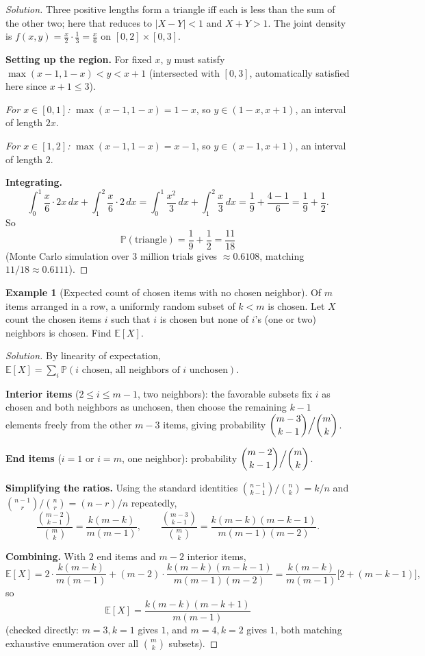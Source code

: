 \documentclass[11pt]{article}
\theoremstyle{definition}
\newtheorem{example}{Example}[section]
\newcommand{\E}{\mathbb{E}}
\begin{document}
\begin{proof}[Solution]
Three positive lengths form a triangle iff each is less than the sum of the other two; here that reduces to $|X-Y|<1$ and $X+Y>1$. The joint density is $f(x,y)=\tfrac x2\cdot\tfrac13=\tfrac x6$ on $[0,2]\times[0,3]$.

\textbf{Setting up the region.} For fixed $x$, $y$ must satisfy $\max(x-1,1-x)<y<x+1$ (intersected with $[0,3]$, automatically satisfied here since $x+1\le3$).

\emph{For $x\in[0,1]$:} $\max(x-1,1-x)=1-x$, so $y\in(1-x,x+1)$, an interval of length $2x$.

\emph{For $x\in[1,2]$:} $\max(x-1,1-x)=x-1$, so $y\in(x-1,x+1)$, an interval of length $2$.

\textbf{Integrating.}
\[
\int_0^1\frac x6\cdot2x\,dx+\int_1^2\frac x6\cdot2\,dx=\int_0^1\frac{x^2}3\,dx+\int_1^2\frac x3\,dx=\frac19+\frac{4-1}6=\frac19+\frac12.
\]
So
\[
\mathbb P(\text{triangle})=\frac19+\frac12=\boxed{\frac{11}{18}}
\]
(Monte Carlo simulation over $3$ million trials gives $\approx0.6108$, matching $11/18\approx0.6111$).
\end{proof}

\begin{example}[Expected count of chosen items with no chosen neighbor]
Of $m$ items arranged in a row, a uniformly random subset of $k<m$ is chosen. Let $X$ count the chosen items $i$ such that $i$ is chosen but none of $i$'s (one or two) neighbors is chosen. Find $\E[X]$.
\end{example}

\begin{proof}[Solution]
By linearity of expectation, $\E[X]=\sum_i \mathbb P(i \text{ chosen, all neighbors of } i \text{ unchosen})$.

\textbf{Interior items} ($2\le i\le m-1$, two neighbors): the favorable subsets fix $i$ as chosen and both neighbors as unchosen, then choose the remaining $k-1$ elements freely from the other $m-3$ items, giving probability $\dbinom{m-3}{k-1}\Big/\dbinom mk$.

\textbf{End items} ($i=1$ or $i=m$, one neighbor): probability $\dbinom{m-2}{k-1}\Big/\dbinom mk$.

\textbf{Simplifying the ratios.} Using the standard identities $\binom{n-1}{k-1}/\binom nk=k/n$ and $\binom{n-1}{r}/\binom nr=(n-r)/n$ repeatedly,
\[
\frac{\binom{m-2}{k-1}}{\binom mk}=\frac{k(m-k)}{m(m-1)},\qquad \frac{\binom{m-3}{k-1}}{\binom mk}=\frac{k(m-k)(m-k-1)}{m(m-1)(m-2)}.
\]

\textbf{Combining.} With $2$ end items and $m-2$ interior items,
\[
\E[X]=2\cdot\frac{k(m-k)}{m(m-1)}+(m-2)\cdot\frac{k(m-k)(m-k-1)}{m(m-1)(m-2)}=\frac{k(m-k)}{m(m-1)}\Big[2+(m-k-1)\Big],
\]
so
\[
\E[X]=\boxed{\frac{k(m-k)(m-k+1)}{m(m-1)}}
\]
(checked directly: $m=3,k=1$ gives $1$, and $m=4,k=2$ gives $1$, both matching exhaustive enumeration over all $\binom mk$ subsets).
\end{proof}
\end{document}

